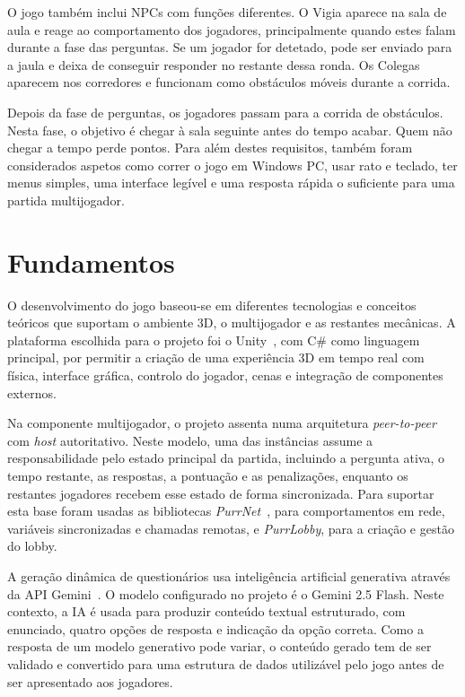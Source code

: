 O jogo também inclui NPCs com funções diferentes. O Vigia aparece na sala de aula e reage ao comportamento dos jogadores, principalmente quando estes falam durante a fase das perguntas. Se um jogador for detetado, pode ser enviado para a jaula e deixa de conseguir responder no restante dessa ronda. Os Colegas aparecem nos corredores e funcionam como obstáculos móveis durante a corrida.

Depois da fase de perguntas, os jogadores passam para a corrida de obstáculos. Nesta fase, o objetivo é chegar à sala seguinte antes do tempo acabar. Quem não chegar a tempo perde pontos. Para além destes requisitos, também foram considerados aspetos como correr o jogo em Windows PC, usar rato e teclado, ter menus simples, uma interface legível e uma resposta rápida o suficiente para uma partida multijogador.


\section{Fundamentos}
\label{sec:fundamentos}

O desenvolvimento do jogo baseou-se em diferentes tecnologias e conceitos teóricos que suportam o ambiente 3D, o multijogador e as restantes mecânicas. A plataforma escolhida para o projeto foi o Unity~\cite{UnityTechnologies2026}, com C\# como linguagem principal, por permitir a criação de uma experiência 3D em tempo real com física, interface gráfica, controlo do jogador, cenas e integração de componentes externos.

Na componente multijogador, o projeto assenta numa arquitetura \textit{peer-to-peer} com \textit{host} autoritativo. Neste modelo, uma das instâncias assume a responsabilidade pelo estado principal da partida, incluindo a pergunta ativa, o tempo restante, as respostas, a pontuação e as penalizações, enquanto os restantes jogadores recebem esse estado de forma sincronizada. Para suportar esta base foram usadas as bibliotecas \textit{PurrNet}~\cite{PurrNet2026}, para comportamentos em rede, variáveis sincronizadas e chamadas remotas, e \textit{PurrLobby}, para a criação e gestão do lobby.

A geração dinâmica de questionários usa inteligência artificial generativa através da API Gemini~\cite{GoogleDeepMind2025}. O modelo configurado no projeto é o Gemini 2.5 Flash. Neste contexto, a IA é usada para produzir conteúdo textual estruturado, com enunciado, quatro opções de resposta e indicação da opção correta. Como a resposta de um modelo generativo pode variar, o conteúdo gerado tem de ser validado e convertido para uma estrutura de dados utilizável pelo jogo antes de ser apresentado aos jogadores.

